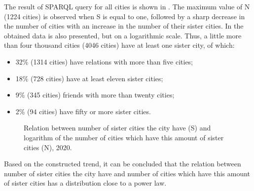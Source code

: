 The result of SPARQL query for all cities is shown in . The maximum value of N (\num{1224} cities) is observed when S is equal to one, followed by a sharp decrease in the number of cities with an increase in the number of their sister cities. In  the obtained data is also presented, but on a logarithmic scale. Thus, a little more than four thousand cities (4046 cities) have at least one sister city, of which:

\begin{itemize}
\item 32\% (1314 cities) have relations with more than five cities;
\item 18\% (728 cities) have at least eleven sister cities;
\item 9\% (345 cities) friends with more than twenty cities;
\item 2\% (94 cities) have fifty or more sister cities.
\end{itemize}

\begin{figure*}[h]
{
\setlength{\fboxsep}{0pt}%
\setlength{\fboxrule}{1pt}%
%
}
  \caption{Relation between number of sister cities the city have (S) and logarithm of the number of cities which have this amount of sister cities (N), 2020.}%
\end{figure*}

Based on the constructed trend, it can be concluded that the relation between number of sister cities the city have and number of cities which have this amount of sister cities has a distribution close to a power law.

